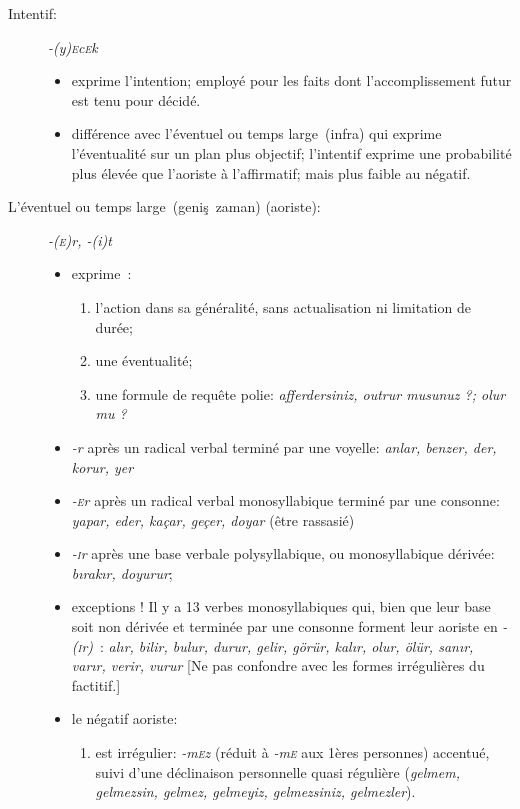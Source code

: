 \documentclass{cours}
\newcommand{\ch}{\c{s}}
\newcommand{\sci}{\textsc{i}}
\newcommand{\sce}{\textsc{e}}
\begin{document}
\begin{description}
    \item [Intentif:] {\sl -(y)\sce c\sce k}
          \begin{itemize}
              \item exprime l'intention; employé pour les faits dont l'accomplissement futur est tenu pour décidé.
              \item différence avec l'éventuel ou \og temps large\fg\ (infra) qui exprime l'éventualité sur un plan plus objectif; l'intentif exprime une probabilité plus élevée que l'aoriste à l'affirmatif; mais plus faible au négatif.
          \end{itemize}
    \item [L'éventuel ou \og temps large\fg\ (geni\ch\ zaman) (aoriste):] \textsl{-(\sce)r, -(i)t}
          \begin{itemize}
              \item exprime~:
                    \begin{enumerate}
                        \item l'action dans sa généralité, sans actualisation ni limitation de durée;
                        \item une éventualité;
                        \item une formule de requête polie: \textsl{afferdersiniz, outrur musunuz ?; olur mu ?}
                    \end{enumerate}
              \item \textsl{-r} après un radical verbal terminé par une voyelle: \textsl{anlar, benzer, der, korur, yer}
              \item \textsl{-\sce r} après un radical verbal monosyllabique terminé par une consonne: \textsl{yapar, eder, kaçar, geçer, doyar} (être rassasié)
              \item \textsl{-\sci r} après une base verbale polysyllabique, ou monosyllabique dérivée: \textsl{b\i rak\i r, doyurur};
              \item exceptions ! Il y a 13 verbes monosyllabiques qui, bien que leur base soit non dérivée et terminée par une consonne forment leur aoriste en \textsl{-(\sci r)}~: \textsl{al\i r, bilir, bulur, durur, gelir, görür, kal\i r, olur, ölür, san\i r, var\i r, verir, vurur} [Ne pas confondre avec les formes irrégulières du factitif.]
              \item le négatif aoriste:
                    \begin{enumerate}
                        \item est irrégulier: \textsl{-m\sce z} (réduit à \textsl{-m\sce} aux 1ères personnes) accentué, suivi d'une déclinaison personnelle quasi régulière (\textsl{gelmem, gelmezsin, gelmez, gelmeyiz, gelmezsiniz, gelmezler}).

\end{enumerate}
\end{itemize}
\end{description}
\end{document}

